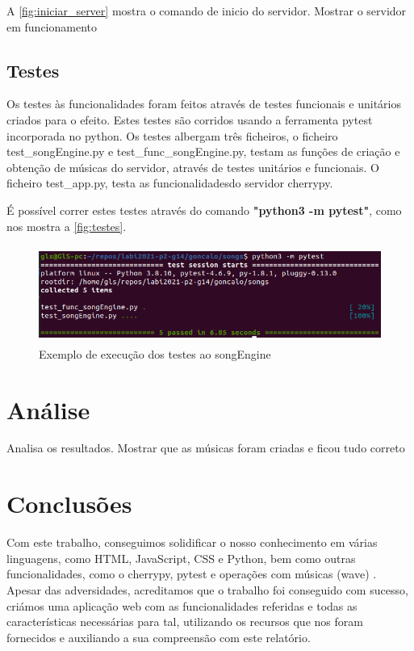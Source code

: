 \documentclass{report}
\begin{document}
A \autoref{fig:iniciar_server} mostra o comando de inicio do servidor.
Mostrar o servidor em funcionamento

\section{Testes}
\label{sec:testes}

Os testes às funcionalidades foram feitos através de testes funcionais e unitários criados para 
o efeito. Estes testes são corridos usando a ferramenta pytest incorporada no python. 
Os testes albergam três ficheiros, o ficheiro test\_songEngine.py e test\_func\_songEngine.py, 
testam as funções de criação e obtenção de músicas do servidor, através de testes unitários e
funcionais. O ficheiro test\_app.py, testa as funcionalidadesdo servidor cherrypy.

É possível correr estes testes através do comando \textbf{"python3 -m pytest"}, como nos mostra 
a \autoref{fig:testes}.

\begin{figure}[ht]
\center 
\includegraphics[height=90pt]{img/pytest.png}
\caption{Exemplo de execução dos testes ao songEngine}
\label{fig:testes}
\end{figure}


\chapter{Análise}
\label{chap.analise}
Analisa os resultados.
Mostrar que as músicas foram criadas e ficou tudo correto

\chapter{Conclusões}
\label{chap.conclusao}
Com este trabalho, conseguimos solidificar o nosso conhecimento em várias linguagens, como HTML, JavaScript, CSS e 
Python, bem como outras funcionalidades, como o cherrypy, pytest e operações com músicas (wave) \cite{stackoverflow}
 \cite{schools} \cite{librariabootstrap}.
Apesar das adversidades, acreditamos que o trabalho foi conseguido com sucesso, criámos uma aplicação 
web com as funcionalidades referidas e todas as características necessárias para tal, utilizando os recursos que 
nos foram fornecidos e auxiliando a sua compreensão com este relatório.
\end{document}
